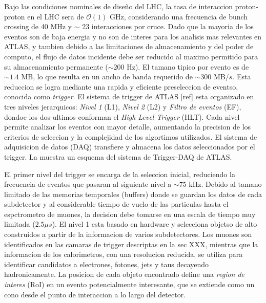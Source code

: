 Bajo las condiciones nominales de dise\~no del LHC, la tasa de interaccion proton-proton
en el LHC sera de $\mathcal{O}(1)$ GHz, considerando una frecuencia de bunch crossing
de 40 MHz y $\sim$ 23 interacciones por cruce. Dado que la mayoria de los eventos son
de baja energia y no son de interes para los analisis mas relevantes en ATLAS, y tambien
debido a las limitaciones de almacenamiento y del poder de computo, el flujo de datos
incidente debe ser reducido al maximo permitido para su almacenamiento permanente
($\sim 200$ Hz). El tamano tipico por evento es de $\sim 1.4$ MB, lo que resulta en un
ancho de banda requerido de $\sim 300$ MB/$s$. Esta reduccion se logra mediante una rapida
y eficiente preseleccion de eventso, conocida como \emph{trigger}. El sistema de trigger
de ATLAS [ref] esta organizado en tres niveles jerarquicos: \emph{Nivel 1} (L1),
\emph{Nivel 2} (L2) y \emph{Filtro de eventos} (EF), dondoe los dos ultimos conforman
el \emph{High Level Trigger} (HLT). Cada nivel permite analizar los eventos con mayor detalle,
aumentando la precision de los criterios de seleccion y la complejidad
de los algortimos utilizados. El sistema de adquisicion de datos (DAQ) transfiere y almacena
los datos seleccionados por el trigger. La {\fig} {\XXX} muestra un esquema del sistema de
Trigger-DAQ de ATLAS.

El primer nivel del trigger se encarga de la seleccion inicial, reduciendo la frecuencia
de eventos que pasaran al siguiente nivel a $\sim 75$ kHz. Debido al tamano limitado
de las memorias temporales (buffers) donde se guardan los datos de cada subdetector y al
considerable tiempo de vuelo de las particulas hasta el espctrometro de muones, la decision
debe tomarse en una escala de tiempo muy limitada ($2.5 \mu s$). El nivel 1 esta basado
en hardware y selecciona objetso de alto {\pt} construidos a partir de la informacion
de varios subdetectores. Los muones son identificados en las camaras de trigger descriptas
en la sec XXX, mientras que la informacion de los calorimetros, con una resolucion reducida,
se utiliza para identificar candidatos a electrones, fotones, jets y taus decayendo
hadronicamente. La posicion de cada objeto encontrado define una \emph{region de interes}
(RoI) en un evento potencialmente interesante, que se extiende como un cono desde el punto de
interaccion a lo largo del detector.

